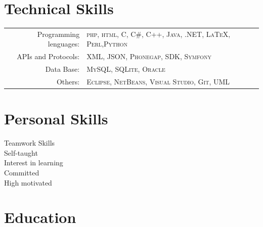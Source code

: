 \documentclass[a4paper,10pt]{article} %
\begin{document}
\section{Technical Skills}

\begin{tabular}{rl}
Programming lenguages: & \textsc{php}, \textsc{html}, \textsc{C},
\textsc{C\#}, \textsc{C++}, \textsc{Java}, \textsc{.NET}, \textsc{LaTeX},
\textsc{Perl},\textsc{Python} \\

APIs and Protocols:  & \textsc{XML}, \textsc{JSON}, \textsc{Phonegap},
\textsc{SDK}, \textsc{Symfony}\\

Data Base: & \textsc{MySQL}, \textsc{SQLite}, \textsc{Oracle}\\

Others: & \textsc{Eclipse}, \textsc{NetBeans}, \textsc{Visual Studio},
\textsc{Git}, \textsc{UML} \\

\end{tabular}

\section{Personal Skills}

Teamwork Skills\\
Self-taught\\
Interest in learning\\
Committed\\
High motivated\\


\section{Education}
\end{document}
